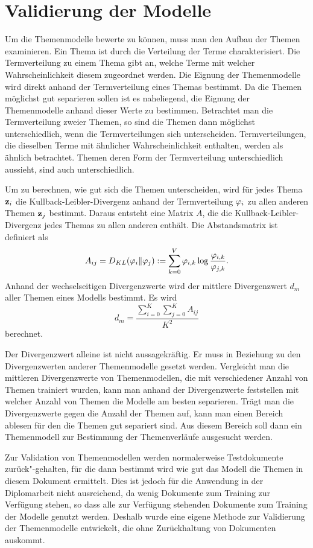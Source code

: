 \section{Validierung der Modelle}
\label{sec:topicValidation}
Um die Themenmodelle bewerte zu können, muss man den Aufbau der Themen examinieren. Ein Thema ist durch die Verteilung der Terme charakterisiert. Die Termverteilung zu einem Thema gibt an, welche Terme mit welcher Wahrscheinlichkeit diesem zugeordnet werden. Die Eignung der Themenmodelle wird direkt anhand der Termverteilung eines Themas bestimmt. Da die Themen möglichst gut separieren sollen ist es naheliegend, die Eignung der Themenmodelle anhand dieser Werte zu bestimmen. Betrachtet man die Termverteilung zweier Themen, so sind die Themen dann möglichst unterschiedlich, wenn die Termverteilungen sich unterscheiden. Termverteilungen, die dieselben Terme mit ähnlicher Wahrscheinlichkeit enthalten, werden als ähnlich betrachtet. Themen deren Form der Termverteilung unterschiedlich aussieht, sind auch unterschiedlich. 

Um zu berechnen, wie gut sich die Themen unterscheiden, wird für jedes Thema $\mathbf{z}_i$ die Kullback-Leibler-Divergenz anhand der Termverteilung $\varphi_{i}$ zu allen anderen Themen $\mathbf{z}_j$ bestimmt. Daraus entsteht eine Matrix $A$, die die Kullback-Leibler-Divergenz jedes Themas zu allen anderen enthält. Die Abstandsmatrix ist definiert als 
\[
	A_{ij} = D_{KL}(\varphi_{i}\Vert\varphi_{j}) := \sum^V_{k=0}\varphi_{i,k} \log{ \frac{\varphi_{i,k}}{\varphi_{j,k}}}\text{.}
\]
Anhand der wechselseitigen Divergenzwerte wird der mittlere Divergenzwert $d_m$ aller Themen eines Modells bestimmt. Es wird 
\[
d_m = \frac{\sum^{K}_{i=0}\sum^{K}_{j=0}{A_{ij}}}{K^2}
\]
berechnet. %

Der Divergenzwert alleine ist nicht aussagekräftig. Er muss in Beziehung zu den Divergenzwerten anderer Themenmodelle gesetzt werden. Vergleicht man die mittleren Divergenzwerte von Themenmodellen, die mit verschiedener Anzahl von Themen trainiert wurden, kann man anhand der Divergenzwerte feststellen mit welcher Anzahl von Themen die Modelle am besten separieren. Trägt man die Divergenzwerte gegen die Anzahl der Themen auf, kann man einen Bereich ablesen für den die Themen gut separiert sind. Aus diesem Bereich soll dann ein Themenmodell zur Bestimmung der Themenverläufe ausgesucht werden. 

Zur Validation von Themenmodellen werden normalerweise Testdokumente zurück"-gehalten, für die dann bestimmt wird wie gut das Modell die Themen in diesem Dokument ermittelt. Dies ist jedoch für die Anwendung in der Diplomarbeit nicht ausreichend, da wenig Dokumente zum Training zur Verfügung stehen, so dass alle zur Verfügung stehenden Dokumente zum Training der Modelle genutzt werden. Deshalb wurde eine eigene Methode zur Validierung der Themenmodelle entwickelt, die ohne Zurückhaltung von Dokumenten auskommt. 








